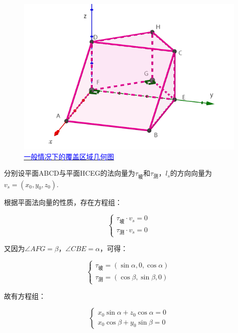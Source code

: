 \begin{figure}[h]
    \centering
    \includegraphics[scale=0.4]{res/img/一般情况下的覆盖区域几何图.png}
    \caption{\href{https://www.geogebra.org/m/absuxwpk}{\textcolor{blue}{一般情况下的覆盖区域几何图}}}
    \label{fig:一般情况下的覆盖区域几何图}
\end{figure}

分别设平面ABCD与平面HCEG的法向量为$\tau_\text{坡}$和$\tau_\text{测}$，$l_s$的方向向量为$v_s = (x_0, y_0, z_0)$.

根据平面法向量的性质，存在方程组：

\begin{equation}
    \begin{cases}
        \tau_\text{坡} \cdot v_s = 0 \\
        \tau_\text{测} \cdot v_s = 0
    \end{cases}
\end{equation}

又因为$\angle AFG=\beta$，$\angle CBE=\alpha$，可得：

\begin{equation}
    \begin{cases}
        \tau_\text{坡} = (\sin\alpha, 0, \cos\alpha) \\
        \tau_\text{测} = (\cos\beta, \sin\beta, 0)
    \end{cases}
\end{equation}

故有方程组：

\begin{equation}
    \begin{cases}
        x_0\sin\alpha + z_0\cos\alpha = 0 \\
        x_0\cos\beta + y_0 \sin\beta = 0
    \end{cases}
\end{equation}

